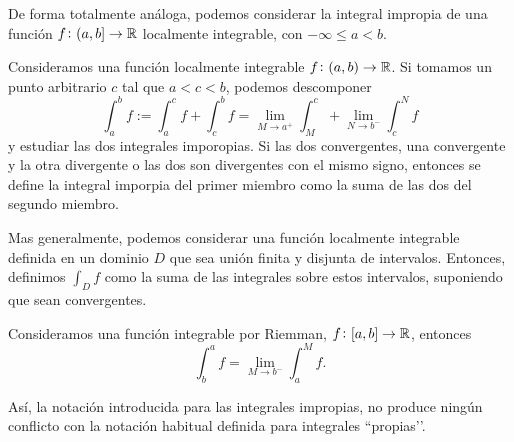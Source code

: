 \begin{obs}
    De forma totalmente análoga, podemos considerar la integral impropia de una
    función $f \colon (a,b] \to \mathbb{R}$ localmente integrable, con $-\infty \leq a
    < b$.
\end{obs}

\begin{defi}
    Consideramos una función localmente integrable $f \colon (a,b) \to \mathbb{R}$. Si
    tomamos un punto arbitrario $c$ tal que $a < c < b$, podemos descomponer
    \[
        \int^b_a f := \int^c_a f + \int^b_c f = \lim_{M \to a^+} \int^c_M +
        \lim_{N \to b^-} \int^N_c f
    \]
    y estudiar las dos integrales imporopias. Si las dos convergentes, una
    convergente y la otra divergente o las dos son divergentes con el mismo
    signo, entonces se define la integral imporpia del primer miembro como la
    suma de las dos del segundo miembro.
\end{defi}
\begin{obs*}
    Mas generalmente, podemos considerar una función localmente integrable definida
    en un dominio $D$ que sea unión finita y disjunta de intervalos. Entonces,
    definimos $\int_D f$ como la suma de las integrales sobre estos intervalos,
    suponiendo que sean convergentes.
\end{obs*}

\begin{prop}
    Consideramos una función integrable por Riemman, $f \colon [a,b] \to \mathbb{R}$,
    entonces
    \[
        \int^a_b f = \lim_{M \to b^-} \int^M_a f.
    \]
\end{prop}

\begin{obs*}
    Así, la notación introducida para las integrales impropias, no produce ningún
    conflicto con la notación habitual definida para integrales ``propias’’.
\end{obs*}

